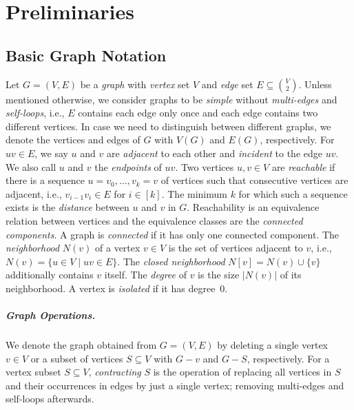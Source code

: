 \section{Preliminaries}\label{sec:preliminaries}
%
\subsection{Basic Graph Notation}
%
Let $G = (V, E)$ be a \emph{graph} with \emph{vertex} set $V$ and \emph{edge} set $E \subseteq \binom{V}{2}$.
Unless mentioned otherwise, we consider graphs to be \emph{simple} without \emph{multi-edges} and \emph{self-loops}, i.e., $E$ contains each edge only once and each edge contains two different vertices.
In case we need to distinguish between different graphs, we denote the vertices and edges of $G$ with $V(G)$ and $E(G)$, respectively.
For $uv \in E$, we say $u$ and $v$ are \emph{adjacent} to each other and \emph{incident} to the edge $uv$.
We also call $u$ and $v$ the \emph{endpoints} of $uv$.
%
Two vertices $u, v \in V$ are \emph{reachable} if there is a sequence $u = v_0, \dots, v_k = v$ of vertices such that consecutive vertices are adjacent, i.e., $v_{i - 1}v_i \in E$ for $i \in [k]$.
The minimum $k$ for which such a sequence exists is the \emph{distance} between $u$ and $v$ in $G$.
Reachability is an equivalence relation between vertices and the equivalence classes are the \emph{connected components}.
A graph is \emph{connected} if it has only one connected component.
%
%
The \emph{neighborhood} $N(v)$ of a vertex $v \in V$ is the set of vertices adjacent to $v$, i.e., $N(v) = \{u \in V \mid uv \in E\}$.
The \emph{closed neighborhood} $N[v] = N(v) \cup \{v\}$ additionally contains $v$ itself.
The \emph{degree} of $v$ is the size $|N(v)|$ of its neighborhood.
A vertex is \emph{isolated} if it has degree~$0$.  
%
\subparagraph{Graph Operations.}
%
We denote the graph obtained from $G = (V, E)$ by deleting a single vertex $v \in V$ or a subset of vertices $S \subseteq V$ with $G - v$ and $G - S$, respectively.
For a vertex subset $S \subseteq V$, \emph{contracting} $S$ is the operation of replacing all vertices in $S$ and their occurrences in edges by just a single vertex; removing multi-edges and self-loops afterwards.
